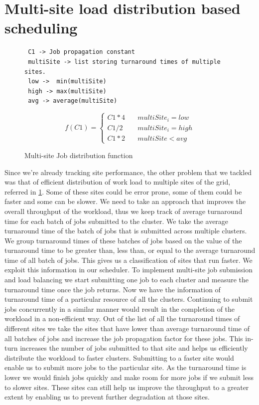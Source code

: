 \documentclass[ms,electronic,double]{nuthesis}
\begin{document}
\section{Multi-site load distribution based scheduling} 
 \begin{figure}[htbp!]
   
 \begin{verbatim}
 C1 -> Job propagation constant
 multiSite -> list storing turnaround times of multiple sites.
 low ->  min(multiSite)  
 high -> max(multiSite)
 avg -> average(multiSite)
 \end{verbatim}

$$
f(C1) = \left\{
        \begin{array}{ll}
            C1*4 & \quad multiSite_i = low\\ 
            C1/2 & \quad multiSite_i = high \\
            C1*2 & \quad multiSite < avg
        \end{array}
    \right.
$$

\caption{Multi-site Job distribution function}
  \label{fig:multiSite2}

\end{figure}
Since we're already tracking site performance, the other problem that we tackled was that of efficient distribution of work load to multiple sites of the 
grid, referred in \ref{fig:multiSite2}.
Some of these sites could be error prone, some of them could be faster and some can be slower. We need to
take an approach that improves the overall throughput of the workload, thus we keep track of average turnaround
 time for each batch of jobs submitted to the cluster. We take the average turnaround time of the batch of jobs that is submitted 
 across multiple clusters. We group turnaround times of these batches of jobs based on the value of the 
 turnaround time to be greater than, less than, or equal to the average turnaround time of all batch of jobs.
 This gives us a classification of sites that run faster. We exploit this information in our scheduler. 
 To implement multi-site job submission and load balancing we start submitting one job to each cluster 
 and measure the turnaround time once the job returns. Now we have the information of turnaround time 
 of a particular resource of all the clusters. Continuing to submit jobs concurrently in a similar manner
  would result in the completion of
 the workload in a non-efficient way. Out of the list of all the turnaround times of different sites we take the 
 sites
 that have lower than average turnaround time of all batches of jobs and increase the job propagation 
 factor for these jobs. This in-turn increases the number of jobs submitted to that site and helps us efficiently distribute 
 the workload to faster clusters. Submitting to a faster site would enable us to submit 
 more jobs to the particular site. As the turnaround time is lower we would finish jobs quickly and make room for more
 jobs if we submit less to slower sites. These sites can still help us improve the throughput to a greater extent by enabling us to 
 prevent further degradation at those sites.
 
\end{document}
